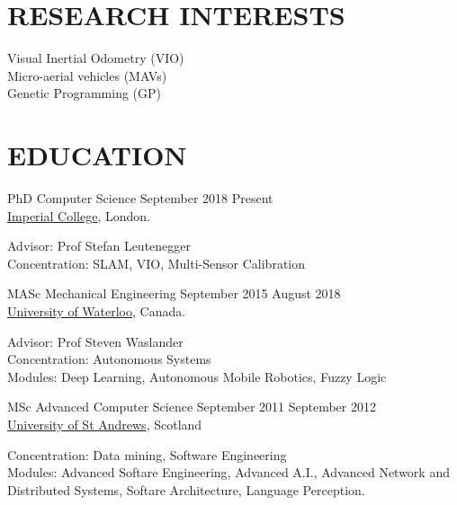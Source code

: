 \documentclass[line,margin]{cv}
\begin{document}

\address{Email: \href{mailto:chutsu@gmail.com}{chutsu@gmail.com}}
\address{ebsite: \href{http://chutsu.github.io}{http://chutsu.github.io}}


\begin{resume}

\section{RESEARCH INTERESTS}
Visual Inertial Odometry (VIO) \\
Micro-aerial vehicles (MAVs) \\
Genetic Programming (GP)



\section{EDUCATION}
PhD Computer Science
\hfill September 2018 \textemdash{} Present \\
\href{http://www.imperial.ac.uk}{Imperial College}, London.

\vspace{0.1em}
\begin{adjustwidth}{2.0em}{2.0em}
	Advisor: Prof Stefan Leutenegger \\
	Concentration: SLAM, VIO, Multi-Sensor Calibration
\end{adjustwidth}


MASc Mechanical Engineering
\hfill September 2015 \textemdash{} August 2018 \\
\href{http://www.uwaterloo.ca}{University of Waterloo}, Canada.

\vspace{0.1em}
\begin{adjustwidth}{2.0em}{2.0em}
	Advisor: Prof Steven Waslander \\
	Concentration: Autonomous Systems \\
	Modules: Deep Learning, Autonomous Mobile Robotics, Fuzzy Logic
\end{adjustwidth}


MSc Advanced Computer Science
\hfill September 2011 \textemdash{} September 2012 \\
\href{http://www.st-andrews.ac.uk}{University of St Andrews}, Scotland

\vspace{0.1em}
\begin{adjustwidth}{2.0em}{2.0em}
	Concentration: Data mining, Software Engineering \\
	Modules: Advanced Softare Engineering, Advanced A.I., Advanced Network
	and Distributed Systems, Softare Architecture, Language Perception.
\end{adjustwidth}



\end{resume}
\end{document}
